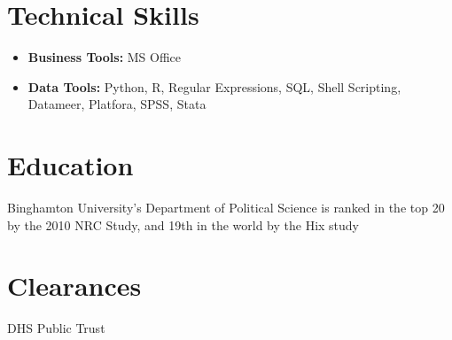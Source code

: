 \documentclass[10pt,a4paper]{moderncv}
\begin{document}
\section{Technical Skills}
{\begin{itemize}
\item \textbf{Business Tools:} MS Office
\item \textbf{Data Tools:} Python, R, Regular Expressions, SQL, Shell
  Scripting, Datameer, Platfora, SPSS, Stata
\end{itemize}}

         
\section{Education}
         {}{}{Binghamton University’s Department of
           Political Science is ranked in the top 20 by the
           2010 NRC Study, and 19th in the world by the Hix study}
         
         {}{}{}


\section{Clearances}
DHS Public Trust
         
\end{document}
